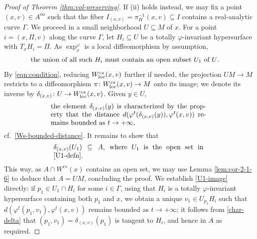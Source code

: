 \documentclass[10pt,a4paper]{amsart}
\numberwithin{equation}{section}
\theoremstyle{definition}
\begin{document}
\begin{proof}[Proof of Theorem \ref{thm:vol-preserving}]
If (ii) holds instead, we may fix a point $(x,v) \in A^{\mathrm{o} \mathrm{o}}$ such that the fiber $I_{(x,v)} = \pi_H^{-1}(x,v) \subseteq I$
contains a real-analytic curve $\Gamma$. We proceed in a small neighborhood $U \subseteq M$ of $x$. For a point $i = (x, \Pi, v)$ along the curve $\Gamma$, let $H_i \subseteq U$ be a totally $\varphi$-invariant hypersurface with $T_xH_i = \Pi$. As $\exp_x^\varphi$ is a local diffeomorphism by assumption, \begin{equation}\label{U1-defn}\parbox{.82\textwidth}{the union of all such $H_i$ must contain an open subset $U_1$ of $U$.}\end{equation} By \eqref{eqn:condition}, reducing $W^{cs}_{\rm loc}(x,v)$ further if needed, the projection $UM\to M$ restricts to a diffeomorphism $\pi\colon W^{cs}_{\rm loc}(x,v)\to M$ onto its image; we denote its inverse by $\delta_{(x,v)}\colon U \to W^{cs}_{\rm loc}(x,v)$. Given $y\in U$, \begin{equation}\label{char-delta}\parbox{.65\textwidth}{the element $\delta_{(x,v)}(y)$ is characterized by the property that the distance $d(\varphi^t(\delta_{(x,v)}(y)),\varphi^t(x,v))$ remains bounded as $t\to +\infty$,}\end{equation} cf.\ \eqref{Ws-bounded-distance}. It remains to show that \begin{equation}\label{U1-image}
 \parbox{.63\textwidth}{$\delta_{(x,v)}(U_1) \subseteq A$, where $U_1$ is the open set in \eqref{U1-defn}.}
 \end{equation}
 This way, as $A \cap W^{cs}(x)$ contains an open set, we may use Lemma \ref{lem:cor-2-1-6} to deduce that $A = UM$, concluding the proof. We establish \eqref{U1-image} directly: if $p_1 \in U_1 \cap H_i$ for some $i\in \Gamma$, using that $H_i$ is a totally $\varphi$-invariant hypersurface containing both $p_1$ and $x$, we obtain a unique $v_1\in U_{p_1}H_i$ such that $d(\varphi^t(p_1,v_1), \varphi^t(x,v))$ remains bounded as $t\to +\infty$; it follows from \eqref{char-delta} that $(p_1,v_1) = \delta_{(x,v)}(p_1)$ is tangent to $H_i$, and hence in $A$ as required.
 \end{proof}
\end{document}
